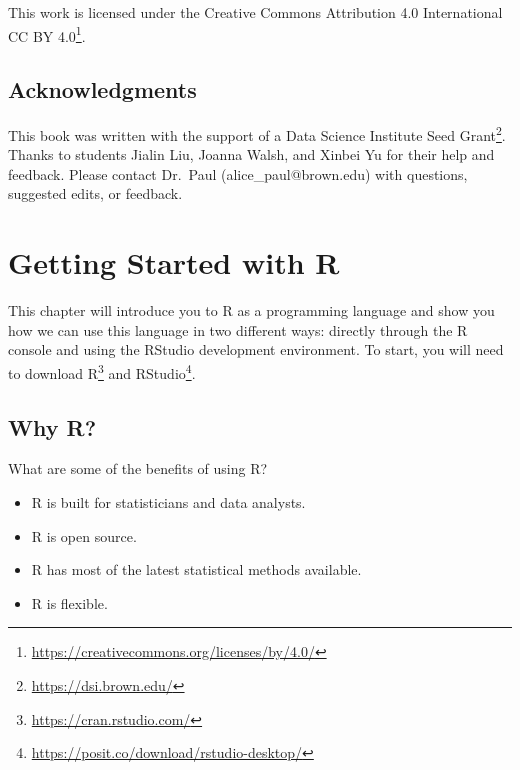 \documentclass[
  letterpaper,
]{krantz}
\providecommand{\tightlist}{%
  \setlength{\itemsep}{0pt}\setlength{\parskip}{0pt}}\usepackage{longtable,booktabs,array}
\renewcommand{\href}[2]{#2\footnote{\url{#1}}}
\begin{document}
This work is licensed under the Creative Commons Attribution 4.0
International \href{https://creativecommons.org/licenses/by/4.0/}{CC BY
4.0}.

\hypertarget{acknowledgments}{%
\section*{Acknowledgments}\label{acknowledgments}}


This book was written with the support of a
\href{https://dsi.brown.edu/}{Data Science Institute Seed Grant}. Thanks
to students Jialin Liu, Joanna Walsh, and Xinbei Yu for their help and
feedback. Please contact Dr.~Paul (alice\_paul@brown.edu) with
questions, suggested edits, or feedback.

\mainmatter


\hypertarget{sec-intro-to-r}{%
\chapter{Getting Started with R}\label{sec-intro-to-r}}

This chapter will introduce you to R as a programming language and show
you how we can use this language in two different ways: directly through
the R console and using the RStudio development environment. To start,
you will need to download \href{https://cran.rstudio.com/}{R} and
\href{https://posit.co/download/rstudio-desktop/}{RStudio}.

\hypertarget{why-r}{%
\section{Why R?}\label{why-r}}

What are some of the benefits of using R?

\begin{itemize}
\tightlist
\item
  R is built for statisticians and data analysts.\\
\item
  R is open source.\\
\item
  R has most of the latest statistical methods available.\\
\item
  R is flexible.
\end{itemize}
\end{document}
